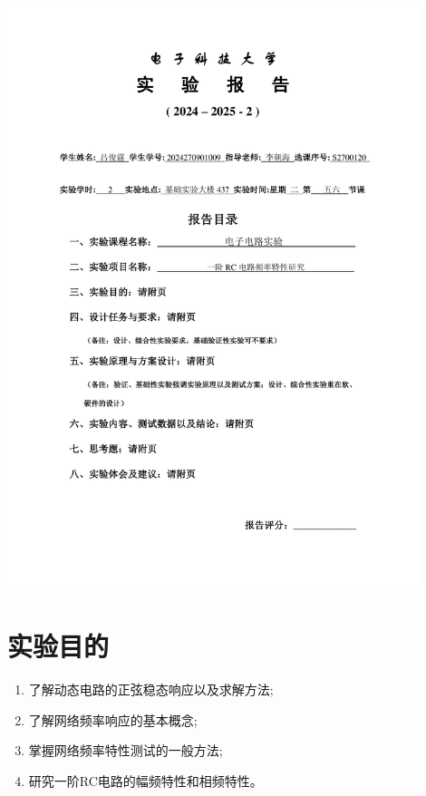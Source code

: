 \documentclass[10pt, a4paper]{article} %
\begin{document}
\begin{titlepage}
    \centering
    \includegraphics[page=1, width=0.9\textwidth, keepaspectratio]{image/实验报告撰写封面.pdf}
    \restoregeometry
\end{titlepage}

\setcounter{section}{2}

\section{实验目的}

\begin{enumerate}[leftmargin=50pt,label=(\arabic*)] %
    \item 了解动态电路的正弦稳态响应以及求解方法; 
    \item 了解网络频率响应的基本概念; 
    \item 掌握网络频率特性测试的一般方法; 
    \item 研究一阶RC电路的幅频特性和相频特性。
\end{enumerate}
\end{document}

